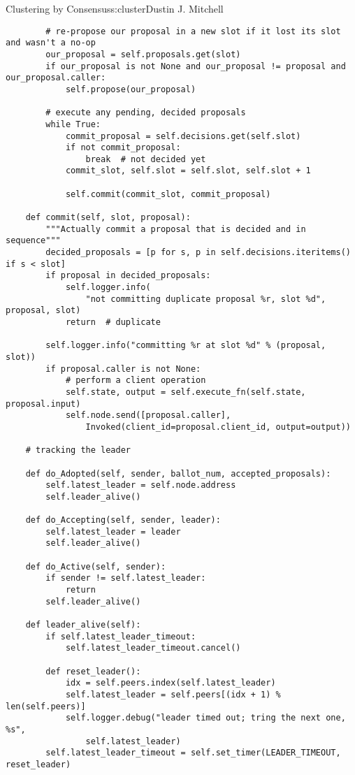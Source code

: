\begin{aosachapter}{Clustering by Consensus}{s:cluster}{Dustin J. Mitchell}
\begin{verbatim}
        # re-propose our proposal in a new slot if it lost its slot and wasn't a no-op
        our_proposal = self.proposals.get(slot)
        if our_proposal is not None and our_proposal != proposal and our_proposal.caller:
            self.propose(our_proposal)

        # execute any pending, decided proposals
        while True:
            commit_proposal = self.decisions.get(self.slot)
            if not commit_proposal:
                break  # not decided yet
            commit_slot, self.slot = self.slot, self.slot + 1

            self.commit(commit_slot, commit_proposal)

    def commit(self, slot, proposal):
        """Actually commit a proposal that is decided and in sequence"""
        decided_proposals = [p for s, p in self.decisions.iteritems() if s < slot]
        if proposal in decided_proposals:
            self.logger.info(
                "not committing duplicate proposal %r, slot %d", proposal, slot)
            return  # duplicate

        self.logger.info("committing %r at slot %d" % (proposal, slot))
        if proposal.caller is not None:
            # perform a client operation
            self.state, output = self.execute_fn(self.state, proposal.input)
            self.node.send([proposal.caller], 
                Invoked(client_id=proposal.client_id, output=output))

    # tracking the leader

    def do_Adopted(self, sender, ballot_num, accepted_proposals):
        self.latest_leader = self.node.address
        self.leader_alive()

    def do_Accepting(self, sender, leader):
        self.latest_leader = leader
        self.leader_alive()

    def do_Active(self, sender):
        if sender != self.latest_leader:
            return
        self.leader_alive()

    def leader_alive(self):
        if self.latest_leader_timeout:
            self.latest_leader_timeout.cancel()

        def reset_leader():
            idx = self.peers.index(self.latest_leader)
            self.latest_leader = self.peers[(idx + 1) % len(self.peers)]
            self.logger.debug("leader timed out; tring the next one, %s", 
                self.latest_leader)
        self.latest_leader_timeout = self.set_timer(LEADER_TIMEOUT, reset_leader)


\end{verbatim}
\end{aosachapter}
